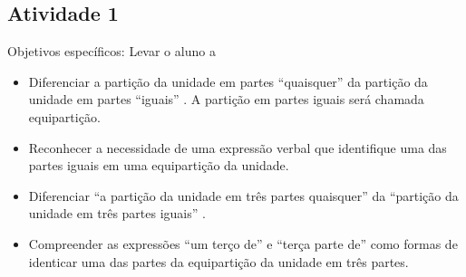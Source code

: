 \documentclass[oneside]{book}
\begin{document}
\begin{multicols}{2}




\subsection{Atividade 1}   Objetivos específicos: Levar o aluno a
\begin{itemize} %
    \item       Diferenciar a partição da unidade em partes       ``quaisquer''       da partição da unidade em partes       ``iguais''      . A partição em partes iguais será chamada equipartição.
    \item       Reconhecer a necessidade de uma expressão verbal que identifique uma das partes iguais em uma equipartição da unidade.
    \item       Diferenciar       ``a partição da unidade em três partes quaisquer''       da       ``partição da unidade em três partes iguais''      .
    \item       Compreender as expressões       ``um terço de''       e       ``terça parte de''       como formas de identicar uma das partes da equipartição da unidade em três partes.
\end{itemize} %




\end{multicols}
\end{document}
